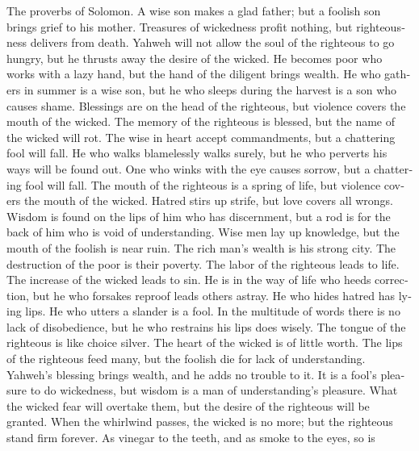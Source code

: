 \begin{paracol}{2}
\begin{otherlanguage}{english}
 The proverbs of Solomon. A wise son makes a glad father;
but a foolish son brings grief to his mother.  Treasures
of wickedness profit nothing, but righteousness delivers from death.
 Yahweh will not allow the soul of the righteous to go
hungry, but he thrusts away the desire of the wicked.  He
becomes poor who works with a lazy hand, but the hand of the diligent
brings wealth.  He who gathers in summer is a wise son,
but he who sleeps during the harvest is a son who causes shame.
 Blessings are on the head of the righteous, but violence
covers the mouth of the wicked.  The memory of the
righteous is blessed, but the name of the wicked will rot.
 The wise in heart accept commandments, but a chattering
fool will fall.  He who walks blamelessly walks surely,
but he who perverts his ways will be found out.  One who
winks with the eye causes sorrow, but a chattering fool will fall.
 The mouth of the righteous is a spring of life, but
violence covers the mouth of the wicked.  Hatred stirs up
strife, but love covers all wrongs.  Wisdom is found on
the lips of him who has discernment, but a rod is for the back of him
who is void of understanding.  Wise men lay up knowledge,
but the mouth of the foolish is near ruin.  The rich
man's wealth is his strong city. The destruction of the poor is their
poverty.  The labor of the righteous leads to life. The
increase of the wicked leads to sin.  He is in the way of
life who heeds correction, but he who forsakes reproof leads others
astray.  He who hides hatred has lying lips. He who
utters a slander is a fool.  In the multitude of words
there is no lack of disobedience, but he who restrains his lips does
wisely.  The tongue of the righteous is like choice
silver. The heart of the wicked is of little worth.  The
lips of the righteous feed many, but the foolish die for lack of
understanding.  Yahweh's blessing brings wealth, and he
adds no trouble to it.  It is a fool's pleasure to do
wickedness, but wisdom is a man of understanding's pleasure.
 What the wicked fear will overtake them, but the desire
of the righteous will be granted.  When the whirlwind
passes, the wicked is no more; but the righteous stand firm forever.
 As vinegar to the teeth, and as smoke to the eyes, so is

\end{otherlanguage}
\end{paracol}
